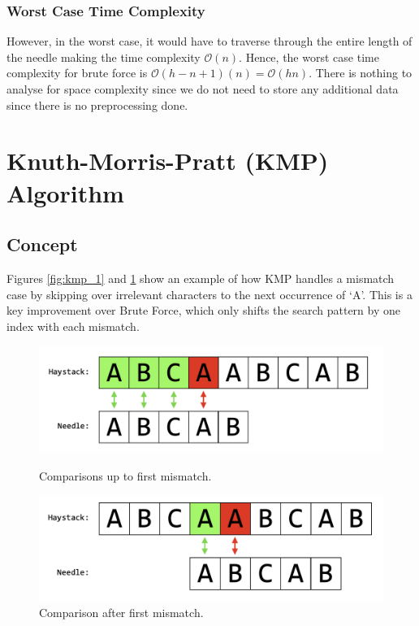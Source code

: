 \subsubsection*{Worst Case Time Complexity}
However, in the worst case, it would have to traverse through the entire length of the needle making the time complexity $\mathcal{O}(n)$. Hence, the worst case time complexity for brute force is $\mathcal{O}(h - n + 1)(n) = \mathcal{O}(hn)$. There is nothing to analyse for space complexity since we do not need to store any additional data since there is no preprocessing done.

\section*{Knuth-Morris-Pratt (KMP) Algorithm}

\subsection*{Concept}
Figures \ref{fig:kmp_1} and \ref{fig:kmp_2} show an example of how KMP handles a mismatch case by skipping over irrelevant characters to the next occurrence of `A'. This is a key improvement over Brute Force, which only shifts the search pattern by one index with each mismatch. 

\begin{figure}[H]
  \centering
  \begin{minipage}[b]{0.49\textwidth}
    \includegraphics[width=\textwidth]{images/kmp_1.png}
    \caption{Comparisons up to first mismatch.}
    \label{fig:kmp_1}
  \end{minipage}
  \hfill
  \begin{minipage}[b]{0.49\textwidth}
    \includegraphics[width=\textwidth]{images/kmp_2.png}
    \caption{Comparison after first mismatch.}
    \label{fig:kmp_2}
  \end{minipage}
\end{figure}

